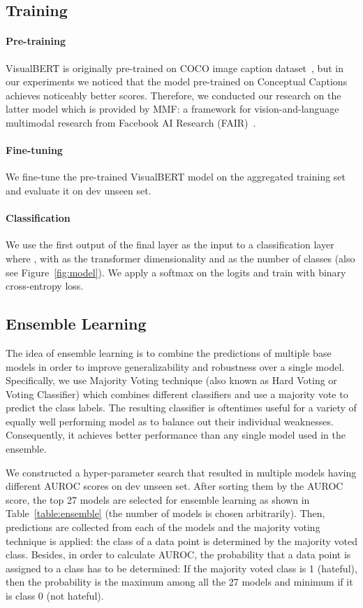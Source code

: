 \documentclass{article}
\begin{document}
\subsection{Training}
  \paragraph{Pre-training}
      VisualBERT is originally pre-trained on COCO image caption dataset~\cite{chen2015microsoft}, but in our experiments we noticed that the model pre-trained on Conceptual Captions~\cite{sharma2018conceptual} achieves noticeably better scores. Therefore, we conducted our research on the latter model which is provided by MMF: a framework for vision-and-language multimodal research from Facebook AI Research (FAIR)~\cite{singh2020mmf}.

  \paragraph{Fine-tuning}
      We fine-tune the pre-trained VisualBERT model on the aggregated training set and evaluate it on dev unseen set. 

  \paragraph{Classification}
      We use the first output of the final layer as the input to a classification layer  where , with  as the transformer dimensionality and  as the number of classes (also see Figure~\ref{fig:model}). We apply a softmax on the logits and train with binary cross-entropy loss.

\subsection{Ensemble Learning}
  The idea of ensemble learning is to combine the predictions of multiple base models in order to improve generalizability and robustness over a single model. Specifically, we use Majority Voting technique (also known as Hard Voting or Voting Classifier) which combines different classifiers and use a majority vote to predict the class labels. The resulting classifier is oftentimes useful for a variety of equally well performing model as to balance out their individual weaknesses. Consequently, it achieves better performance than any single model used in the ensemble.

  We constructed a hyper-parameter search that resulted in multiple models having different AUROC scores on dev unseen set. After sorting them by the AUROC score, the top 27 models are selected for ensemble learning as shown in Table~\ref{table:ensemble} (the number of models is chosen arbitrarily). Then, predictions are collected from each of the models and the majority voting technique is applied: the class of a data point is determined by the majority voted class. Besides, in order to calculate AUROC, the probability that a data point is assigned to a class has to be determined: If the majority voted class is 1 (hateful), then the probability is the maximum among all the 27 models and minimum if it is class 0 (not hateful).
\end{document}
